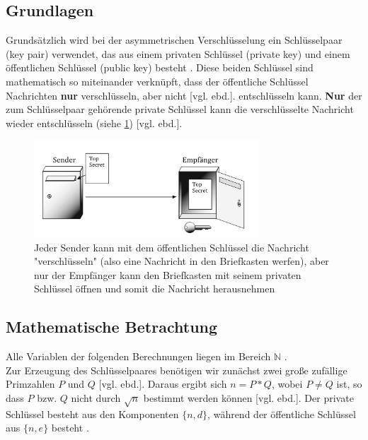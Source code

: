 \documentclass[a4paper,ngerman, headheight=28pt,12pt]{scrartcl}
\newcommand{\vcite}[1]{\cite[vgl.][]{#1}}
\newcommand{\vebd}{[vgl. ebd.]}
\begin{document}
\subsection{Grundlagen}
Grundsätzlich wird bei der asymmetrischen Verschlüsselung ein Schlüsselpaar (key pair) verwendet, das aus einem privaten Schlüssel (private key) und einem öffentlichen Schlüssel (public key) besteht \vcite{Rsa-Basics}. Diese beiden Schlüssel sind mathematisch so miteinander verknüpft, dass der öffentliche Schlüssel Nachrichten \textbf{nur} verschlüsseln, aber nicht \vebd. entschlüsseln kann. \textbf{Nur} der zum Schlüsselpaar gehörende private Schlüssel kann die verschlüsselte Nachricht wieder entschlüsseln (siehe \cref{fig:E2EE}) \vebd.
\begin{figure}[ht]
  \centering
  \includegraphics[width=0.75\textwidth]{Briefkasten-asymm.png}
  \caption{Jeder Sender kann mit dem öffentlichen Schlüssel die Nachricht "verschlüsseln" (also eine Nachricht in den Briefkasten werfen), aber nur der Empfänger kann den Briefkasten mit seinem privaten Schlüssel öffnen und somit die Nachricht herausnehmen \vcite{fig:Rsa-Cryptography} \label{fig:E2EE}}
\end{figure}

\subsection{Mathematische Betrachtung}
Alle Variablen der folgenden Berechnungen liegen im Bereich $\mathbb{N}$ \vcite{RsaGenCond}. \\
Zur Erzeugung des Schlüsselpaares benötigen wir zunächst zwei große zufällige Primzahlen $P$ und $Q$ \vebd. Daraus ergibt sich $n = P * Q$, wobei $P \neq Q$ ist, so dass $P$ bzw. $Q$ nicht durch $\sqrt{n}$ bestimmt werden können \vebd. Der private Schlüssel besteht aus den Komponenten $\{ n, d \}$, während der öffentliche Schlüssel aus $\{ n, e \}$ besteht \vcite{RsaVariables}.
\end{document}
